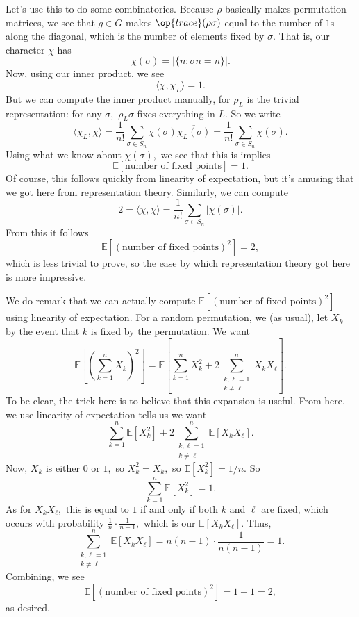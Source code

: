 Let's use this to do some combinatorics. Because $\rho$ basically makes permutation matrices, we see that $g\in G$ makes $\op{trace}(\rho\sigma)$ equal to the number of $1$s along the diagonal, which is the number of elements fixed by $\sigma.$ That is, our character $\chi$ has
\[\chi(\sigma)=|\{n:\sigma n=n\}|.\]
Now, using our inner product, we see
\[\langle\chi,\chi_L\rangle=1.\]
But we can compute the inner product manually, for $\rho_L$ is the trivial representation: for any $\sigma,$ $\rho_L\sigma$ fixes everything in $L.$ So we write
\[\langle\chi_L,\chi\rangle=\frac1{n!}\sum_{\sigma\in S_n}\chi(\sigma)\overline{\chi_L(\sigma)}=\frac1{n!}\sum_{\sigma\in S_n}\chi(\sigma).\]
Using what we know about $\chi(\sigma),$ we see that this is implies
\[\mathbb E[\text{number of fixed points}]=1.\]
Of course, this follows quickly from linearity of expectation, but it's amusing that we got here from representation theory. Similarly, we can compute
\[2=\langle\chi,\chi\rangle=\frac1{n!}\sum_{\sigma\in S_n}|\chi(\sigma)|.\]
From this it follows
\[\mathbb E\left[(\text{number of fixed points})^2\right]=2,\]
which is less trivial to prove, so the ease by which representation theory got here is more impressive.

We do remark that we can actually compute $\mathbb E\left[(\text{number of fixed points})^2\right]$ using linearity of expectation. For a random permutation, we (as usual), let $X_k$ by the event that $k$ is fixed by the permutation. We want
\[\mathbb E\left[\left(\sum_{k=1}^nX_k\right)^2\right]=\mathbb E\left[\sum_{k=1}^nX_k^2+2\sum_{\substack{k,\ell=1\\k\ne\ell}}^nX_kX_\ell\right].\]
To be clear, the trick here is to believe that this expansion is useful. From here, we use linearity of expectation tells us we want
\[\sum_{k=1}^n\mathbb E\left[X_k^2\right]+2\sum_{\substack{k,\ell=1\\k\ne\ell}}^n\mathbb E[X_kX_\ell].\]
Now, $X_k$ is either $0$ or $1,$ so $X_k^2=X_k,$ so $\mathbb E[X_k^2]=1/n.$ So
\[\sum_{k=1}^n\mathbb E\left[X_k^2\right]=1.\]
As for $X_kX_\ell,$ this is equal to $1$ if and only if both $k$ and $\ell$ are fixed, which occurs with probability $\frac1n\cdot\frac1{n-1},$ which is our $\mathbb E[X_kX_\ell].$ Thus,
\[\sum_{\substack{k,\ell=1\\k\ne\ell}}^n\mathbb E[X_kX_\ell]=n(n-1)\cdot\frac1{n(n-1)}=1.\]
Combining, we see
\[\mathbb E\left[(\text{number of fixed points})^2\right]=1+1=2,\]
as desired.

